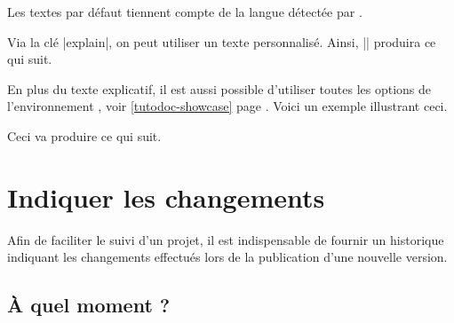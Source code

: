 \begin{tdocnote}
    Les textes par défaut tiennent compte de la langue détectée par \thisproj.
\end{tdocnote}


\begin{tdocexa}
    Via la clé \tdoclatexin|explain|, on peut utiliser un texte personnalisé. Ainsi, \tdoclatexin|| produira ce qui suit.

    \medskip

    \begin{tdocshowcaseDOC}

    \end{tdocshowcaseDOC}
\end{tdocexa}


\begin{tdocexa}
    En plus du texte explicatif, il est aussi possible d'utiliser toutes les options de l'environnement , voir \ref{tutodoc-showcase} page \pageref{tutodoc-showcase}.
    Voici un exemple illustrant ceci.

    \medskip



    \medskip

    Ceci va produire ce qui suit.

    \medskip

    \begin{tdocshowcaseDOC}
        

    \end{tdocshowcaseDOC}
\end{tdocexa}


\section{Indiquer les changements}
\label{tutodoc-changes}

Afin de faciliter le suivi d'un projet, il est indispensable de fournir un historique indiquant les changements effectués lors de la publication d'une nouvelle version.



\subsection{À quel moment ?}
\label{tutodoc-changes-when}

